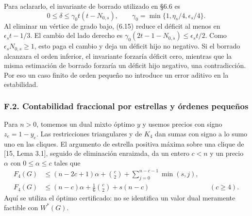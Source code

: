 \documentclass[spanish,11pt,a4paper]{article}
\begin{document}
Para aclararlo, el invariante de borrado utilizado en §6.6 es \[
0\le\delta\le\gamma_0t(t-N_{0,s}),\qquad
\gamma_0=\min\{1,\eta_s/4,\epsilon_s/4\}.
\] Al eliminar un vértice de grado bajo, (6.15) reduce el déficit al menos en \(\epsilon_s t-1/3\). El cambio del lado derecho es \(\gamma_0(2t-1-N_{0,s})\le\epsilon_s t/2\). Como \(\epsilon_sN_{0,s}\ge1\), esto paga el cambio y deja un déficit hijo no negativo. Si el borrado alcanzara el orden inferior, el invariante forzaría déficit cero, mientras que la misma estimación de borrado forzaría un déficit hijo negativo, una contradicción. Por eso un caso finito de orden pequeño no introduce un error aditivo en la estabilidad.

\subsubsection{F.2. Contabilidad fraccional por estrellas y órdenes pequeños}\label{f.2.-contabilidad-fraccional-por-estrellas-y-ordenes-pequenos}

Para \(n>0\), tomemos un dual mixto óptimo \(y\) y usemos precios con signo \(z_e=1-y_e\). Las restricciones triangulares y de \(K_4\) dan sumas con signo a lo sumo uno en las cliques. El argumento de estrella positiva máxima sobre una clique de {[}15, Lema 3.1{]}, seguido de eliminación enraizada, da un entero \(c<n\) y un precio \(\alpha\) con \(0\le\alpha\le c\) tales que \[
\begin{aligned}
F_4(G)&\le(n-2c+1)\alpha+\binom c2+
                \sum_{j=0}^{n-c-1}\min(s,j),\\
F_4(G)&\le(n-c)\alpha+\frac16\binom c2+s(n-c)
                   &&(c\ge4).
\end{aligned}
\tag{F.2}
\] Aquí se utiliza el óptimo certificado: no se identifica un valor dual meramente factible con \(W^*(G)\).
\end{document}
